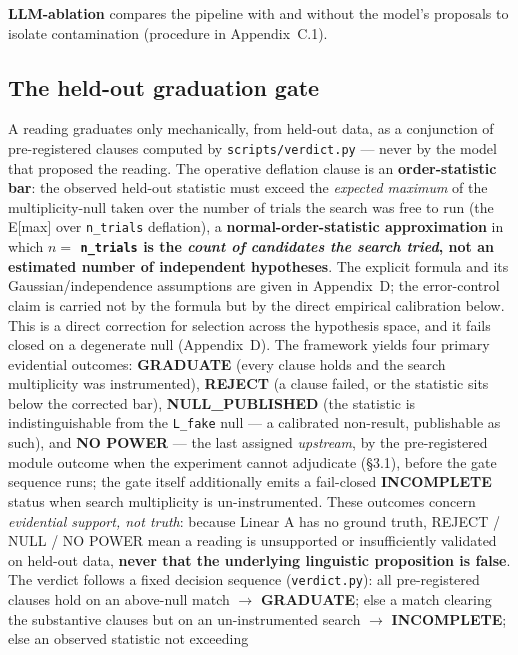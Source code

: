\textbf{LLM-ablation} compares the pipeline with and without the model's
proposals to isolate contamination (procedure in Appendix~C.1).

\subsection{The held-out graduation gate}

A reading graduates only mechanically, from held-out data, as a
conjunction of pre-registered clauses computed by \texttt{scripts/verdict.py}
--- never by the model that proposed the reading. The operative deflation
clause is an \textbf{order-statistic bar}: the observed held-out statistic
must exceed the \emph{expected maximum} of the multiplicity-null taken over
the number of trials the search was free to run (the E[max] over
\texttt{n\_trials} deflation), a \textbf{normal-order-statistic
approximation} in which \textbf{$n =$ \texttt{n\_trials} is the \emph{count of
candidates the search tried}, not an estimated number of independent
hypotheses}. The explicit formula and its Gaussian/independence assumptions
are given in Appendix~D; the error-control claim is carried not by the formula
but by the direct empirical calibration below. This is a direct
correction for selection across the hypothesis
space, and it fails closed on a degenerate null (Appendix~D). The framework yields
four primary evidential outcomes: \textbf{GRADUATE} (every clause holds and the
search multiplicity was instrumented), \textbf{REJECT} (a clause failed, or
the statistic sits below the corrected bar), \textbf{NULL\_PUBLISHED} (the
statistic is indistinguishable from the \texttt{L\_fake} null --- a
calibrated non-result, publishable as such), and \textbf{NO POWER} ---
the last assigned \emph{upstream}, by the pre-registered module outcome
when the experiment cannot adjudicate (\S3.1), before the gate sequence
runs; the gate itself additionally emits a fail-closed \textbf{INCOMPLETE}
status when search multiplicity is un-instrumented. These outcomes concern \emph{evidential
support, not truth}: because Linear A has no ground truth, REJECT / NULL /
NO POWER mean a reading is unsupported or insufficiently validated on
held-out data, \textbf{never that the underlying linguistic proposition is
false}. The verdict follows a fixed decision sequence
(\texttt{verdict.py}): all pre-registered clauses hold on an above-null
match $\rightarrow$ \textbf{GRADUATE}; else a match clearing the
substantive clauses but on an un-instrumented search $\rightarrow$
\textbf{INCOMPLETE}; else an observed statistic not exceeding
